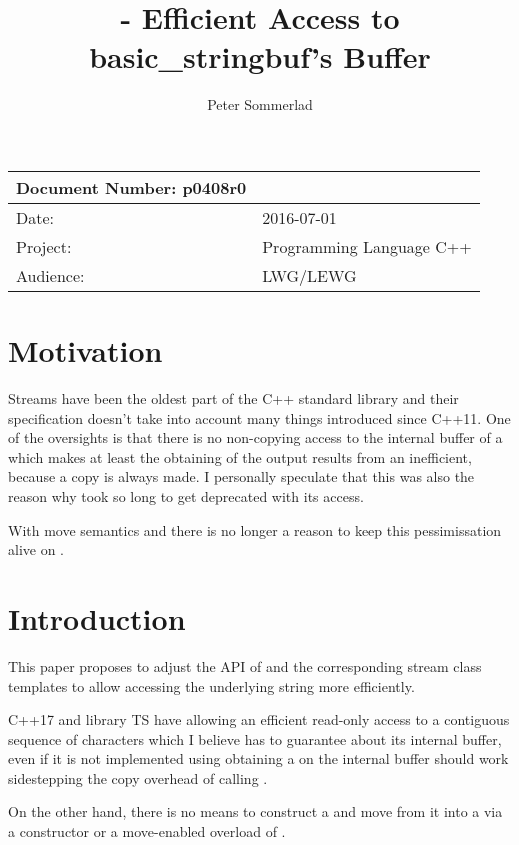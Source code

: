 \documentclass[ebook,11pt,article]{memoir}
\title{\papernumber{} - Efficient Access to basic\_stringbuf's Buffer}
\author{Peter Sommerlad}
\date{\paperdate}                        %
\newcommand{\papernumber}{p0408r0}
\newcommand{\paperdate}{2016-07-01}
\begin{document}
\maketitle
\begin{tabular}[t]{|l|l|}\hline 
Document Number: \papernumber & \\\hline
Date: & \paperdate \\\hline
Project: & Programming Language C++\\\hline 
Audience: & LWG/LEWG\\\hline
\end{tabular}

\chapter{Motivation}
Streams have been the oldest part of the C++ standard library and their specification doesn't take into account many things introduced since C++11. One of  the oversights is that there is no non-copying access to the internal buffer of a  which makes at least the obtaining of the output results from an  inefficient, because a copy is always made. I personally speculate that this was also the reason why  took so long to get deprecated with its  access.

With move semantics and  there is no longer a reason to keep this pessimissation alive on .


\chapter{Introduction}
This paper proposes to adjust the API of  and the corresponding stream class templates to allow accessing the underlying string more efficiently.

C++17 and library TS have  allowing an efficient read-only access to a contiguous sequence of characters which I believe  has to guarantee about its internal buffer, even if it is not implemented using  obtaining a  on the internal buffer should work sidestepping the copy overhead of calling . 

On the other hand, there is no means to construct a  and move from it into a  via a constructor or a move-enabled overload of .
\end{document}

